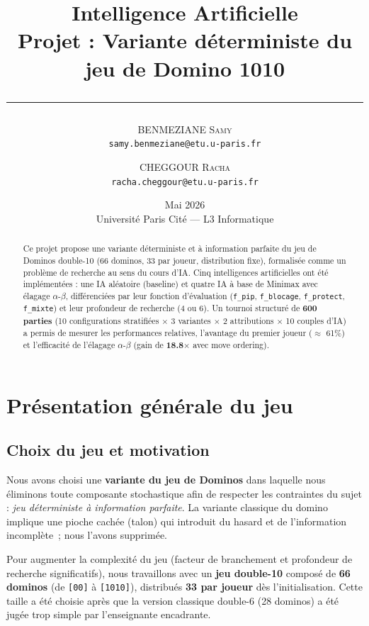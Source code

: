 \documentclass[11pt,a4paper]{article}
\title{
    \vspace{-1.5cm}
    \textbf{Intelligence Artificielle}\\
    \large Projet : Variante déterministe du jeu de Domino 10\textbar{}10\\
    \vspace{0.3cm}
    \rule{0.6\textwidth}{0.5pt}
}
\author{
    \textsc{BENMEZIANE Samy} \\
    \texttt{samy.benmeziane@etu.u-paris.fr}
    \and
    \textsc{CHEGGOUR Racha} \\
    \texttt{racha.cheggour@etu.u-paris.fr}
}
\date{Mai 2026 \\ \small Université Paris Cité --- L3 Informatique}
\begin{document}
\maketitle

\begin{abstract}
Ce projet propose une variante déterministe et à information parfaite du jeu de Dominos
double-10 (66 dominos, 33 par joueur, distribution fixe), formalisée comme un problème
de recherche au sens du cours d'IA. Cinq intelligences artificielles ont été
implémentées : une IA aléatoire (baseline) et quatre IA à base de Minimax avec
élagage \(\alpha\)-\(\beta\), différenciées par leur fonction d'évaluation
(\texttt{f\_pip}, \texttt{f\_blocage}, \texttt{f\_protect}, \texttt{f\_mixte}) et leur
profondeur de recherche (4 ou 6). Un tournoi structuré de \textbf{600 parties}
(10 configurations stratifiées \(\times\) 3 variantes \(\times\) 2 attributions
\(\times\) 10 couples d'IA) a permis de mesurer les performances relatives,
l'avantage du premier joueur (\(\approx\) 61\%) et l'efficacité de l'élagage
\(\alpha\)-\(\beta\) (gain de \textbf{18.8\(\times\)} avec move ordering).
\end{abstract}

\tableofcontents
\newpage

\section{Présentation générale du jeu}

\subsection{Choix du jeu et motivation}

Nous avons choisi une \textbf{variante du jeu de Dominos} dans laquelle nous éliminons
toute composante stochastique afin de respecter les contraintes du sujet :
\textit{jeu déterministe à information parfaite}. La variante classique du domino
implique une pioche cachée (talon) qui introduit du hasard et de l'information
incomplète~; nous l'avons supprimée.

Pour augmenter la complexité du jeu (facteur de branchement et profondeur de recherche
significatifs), nous travaillons avec un \textbf{jeu double-10} composé de
\textbf{66 dominos} (de \texttt{[0\textbar{}0]} à \texttt{[10\textbar{}10]}), distribués
\textbf{33 par joueur} dès l'initialisation. Cette taille a été choisie après que la
version classique double-6 (28 dominos) a été jugée trop simple par l'enseignante
encadrante.
\end{document}
